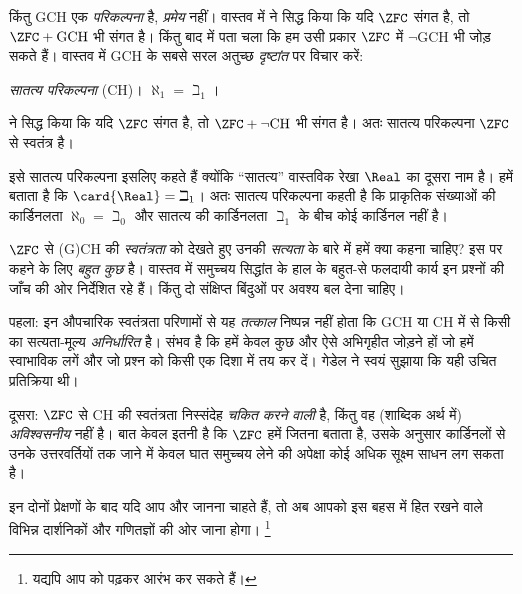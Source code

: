 \documentclass[../../../include/open-logic-section]{subfiles}
\begin{document}
किंतु GCH एक \emph{परिकल्पना} है, \emph{प्रमेय} नहीं। वास्तव में
\citet{Godel1938} ने सिद्ध किया कि यदि $\ZFC$ संगत है, तो
$\ZFC+\text{GCH}$ भी संगत है। किंतु बाद में पता चला कि हम उसी प्रकार
$\ZFC$ में $\lnot$GCH भी जोड़ सकते हैं। वास्तव में GCH के सबसे सरल
अतुच्छ \emph{दृष्टांत} पर विचार करें:

\begin{defish}
\emph{सातत्य परिकल्पना} (CH)। $\aleph_1=\beth_1$।
\end{defish}

\citet{Cohen1963} ने सिद्ध किया कि यदि $\ZFC$ संगत है, तो
$\ZFC+\lnot\text{CH}$ भी संगत है। अतः सातत्य परिकल्पना $\ZFC$ से स्वतंत्र
है।

इसे सातत्य परिकल्पना इसलिए कहते हैं क्योंकि ``सातत्य'' वास्तविक रेखा
$\Real$ का दूसरा नाम है।  हमें बताता है
कि $\card{\Real}=\beth_1$। अतः सातत्य परिकल्पना कहती है कि प्राकृतिक
संख्याओं की कार्डिनलता $\aleph_0=\beth_0$ और सातत्य की कार्डिनलता
$\beth_1$ के बीच कोई कार्डिनल नहीं है।

$\ZFC$ से (G)CH की \emph{स्वतंत्रता} को देखते हुए उनकी \emph{सत्यता} के
बारे में हमें क्या कहना चाहिए? इस पर कहने के लिए \emph{बहुत कुछ} है।
वास्तव में समुच्चय सिद्धांत के हाल के बहुत-से फलदायी कार्य इन प्रश्नों की
जाँच की ओर निर्देशित रहे हैं। किंतु दो संक्षिप्त बिंदुओं पर अवश्य बल देना
चाहिए।

पहला: इन औपचारिक स्वतंत्रता परिणामों से यह \emph{तत्काल} निष्पन्न नहीं
होता कि GCH या CH में से किसी का सत्यता-मूल्य \emph{अनिर्धारित} है। संभव है
कि हमें केवल कुछ और ऐसे अभिगृहीत जोड़ने हों जो हमें स्वाभाविक लगें और जो
प्रश्न को किसी एक दिशा में तय कर दें। गेडेल ने स्वयं सुझाया कि यही उचित
प्रतिक्रिया थी।

दूसरा: $\ZFC$ से CH की स्वतंत्रता निस्संदेह \emph{चकित करने वाली} है,
किंतु वह (शाब्दिक अर्थ में) \emph{अविश्वसनीय} नहीं है। बात केवल इतनी है कि
$\ZFC$ हमें जितना बताता है, उसके अनुसार कार्डिनलों से उनके उत्तरवर्तियों
तक जाने में केवल घात समुच्चय लेने की अपेक्षा कोई अधिक सूक्ष्म साधन लग सकता
है।

इन दोनों प्रेक्षणों के बाद यदि आप और जानना चाहते हैं, तो अब आपको इस बहस में
हित रखने वाले विभिन्न दार्शनिकों और गणितज्ञों की ओर जाना होगा।
\footnote{यद्यपि आप \citet[\S15.6]{Potter2004} को पढ़कर आरंभ कर सकते हैं।}
\end{document}
